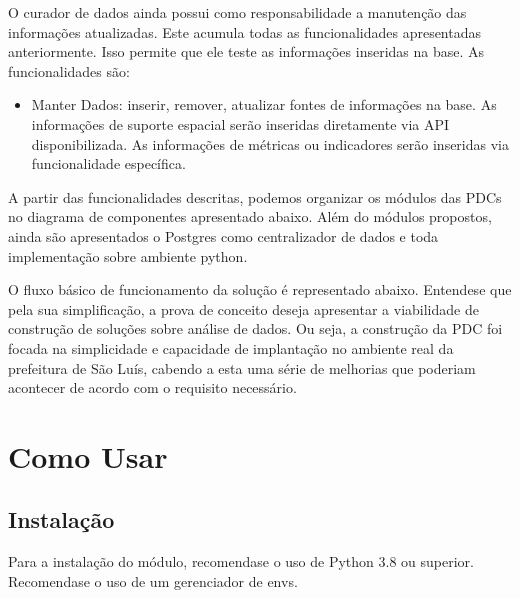\documentclass[letterpaper,10pt,brazil]{sphinxmanual}
\let\sphinxpxdimen\pdfpxdimen\else\newdimen\sphinxpxdimen
\begin{document}
\sphinxAtStartPar
O curador de dados ainda possui como responsabilidade a manutenção das informações atualizadas. Este acumula todas as funcionalidades apresentadas anteriormente.
Isso permite que ele teste as informações inseridas na base. As funcionalidades são:
\begin{itemize}
\item {} 
\sphinxAtStartPar
Manter Dados: inserir, remover, atualizar fontes de informações na base. As informações de suporte espacial serão inseridas diretamente via API disponibilizada. As informações de métricas ou indicadores serão inseridas via funcionalidade específica.

\end{itemize}

\sphinxAtStartPar
A partir das funcionalidades descritas, podemos organizar os módulos das PDCs no diagrama de componentes apresentado abaixo.
Além do módulos propostos, ainda são apresentados o Postgres como centralizador de dados e toda implementação sobre ambiente python.

\noindent\sphinxincludegraphics[width=500\sphinxpxdimen]{{componentes}.png}

\sphinxAtStartPar
O fluxo básico de funcionamento da solução é representado abaixo. Entende\sphinxhyphen{}se que pela sua simplificação, a prova de conceito
deseja apresentar a viabilidade de construção de soluções sobre análise de dados.
Ou seja, a construção da PDC foi focada na simplicidade e capacidade de implantação no ambiente real da prefeitura de São Luís,
cabendo a esta uma série de melhorias que poderiam acontecer de acordo com o requisito necessário.

\noindent\sphinxincludegraphics[width=500\sphinxpxdimen]{{func}.png}

\sphinxstepscope


\chapter{Como Usar}
\label{\detokenize{usage:como-usar}}\label{\detokenize{usage::doc}}

\section{Instalação}
\label{\detokenize{usage:instalacao}}
\sphinxAtStartPar
Para a instalação do módulo, recomenda\sphinxhyphen{}se o uso de Python 3.8 ou superior.
Recomenda\sphinxhyphen{}se o uso de um gerenciador de envs.
\end{document}
